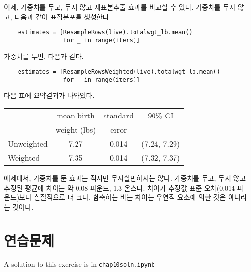이제, 가중치를 두고, 두지 않고 재표본추출 효과를 비교할 수 있다.
가중치를 두지 않고, 다음과 같이 표집분포를 생성한다.

\begin{verbatim}
    estimates = [ResampleRows(live).totalwgt_lb.mean()
                 for _ in range(iters)]
\end{verbatim}

가중치를 두면, 다음과 같다.

\begin{verbatim}
    estimates = [ResampleRowsWeighted(live).totalwgt_lb.mean()
                 for _ in range(iters)]
\end{verbatim}

다음 표에 요약결과가 나와있다.

\begin{center}
\begin{tabular}{|l|c|c|c|}
\hline
                    &  mean birth   & standard  &  90\% CI  \\ 
                    &  weight (lbs) & error     &           \\ 
\hline
Unweighted          &  7.27  &  0.014  &  (7.24, 7.29)  \\ 
Weighted            &  7.35  &  0.014  &  (7.32, 7.37)  \\ 
\hline
\end{tabular}
\end{center}


예제애서, 가중치를 둔 효과는 적지만 무시할만하지는 않다.
가중치를 두고, 두지 않고 추정된 평균에 차이는 약 0.08 파운드, 1.3 온스다.
차이가 추정값 표준 오차(0.014 파운드)보다 실질적으로 더 크다. 함축하는 바는 차이는 우연적 요소에 의한 것은 아니라는 것이다.


\section{연습문제}

A solution to this exercise is in \verb"chap10soln.ipynb"

